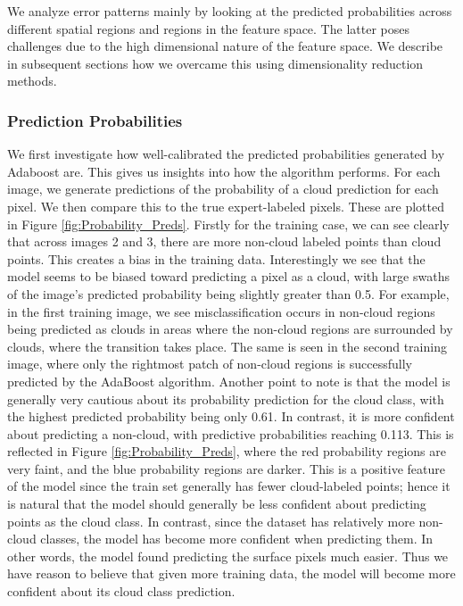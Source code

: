 \documentclass[11pt, letterpaper, journal]{IEEEtran}
\begin{document}
We analyze error patterns mainly by looking at the predicted probabilities across different spatial regions and regions in the feature space. The latter poses challenges due to the high dimensional nature of the feature space. We describe in subsequent sections how we overcame this using dimensionality reduction methods.

\subsubsection{Prediction Probabilities}
We first investigate how well-calibrated the predicted probabilities generated by Adaboost are. This gives us insights into how the algorithm performs. For each image, we generate predictions of the probability of a cloud prediction for each pixel. We then compare this to the true expert-labeled pixels. These are plotted in Figure \ref{fig:Probability_Preds}. Firstly for the training case, we can see clearly that across images 2 and 3, there are more non-cloud labeled points than cloud points. This creates a bias in the training data. Interestingly we see that the model seems to be biased toward predicting a pixel as a cloud, with large swaths of the image's predicted probability being slightly greater than 0.5. For example, in the first training image, we see misclassification occurs in non-cloud regions being predicted as clouds in areas where the non-cloud regions are surrounded by clouds, where the transition takes place. The same is seen in the second training image, where only the rightmost patch of non-cloud regions is successfully predicted by the AdaBoost algorithm. Another point to note is that the model is generally very cautious about its probability prediction for the cloud class, with the highest predicted probability being only 0.61. In contrast, it is more confident about predicting a non-cloud, with predictive probabilities reaching 0.113. This is reflected in Figure \ref{fig:Probability_Preds}, where the red probability regions are very faint, and the blue probability regions are darker. This is a positive feature of the model since the train set generally has fewer cloud-labeled points; hence it is natural that the model should generally be less confident about predicting points as the cloud class. In contrast, since the dataset has relatively more non-cloud classes, the model has become more confident when predicting them. In other words, the model found predicting the surface pixels much easier. Thus we have reason to believe that given more training data, the model will become more confident about its cloud class prediction.
\end{document}
